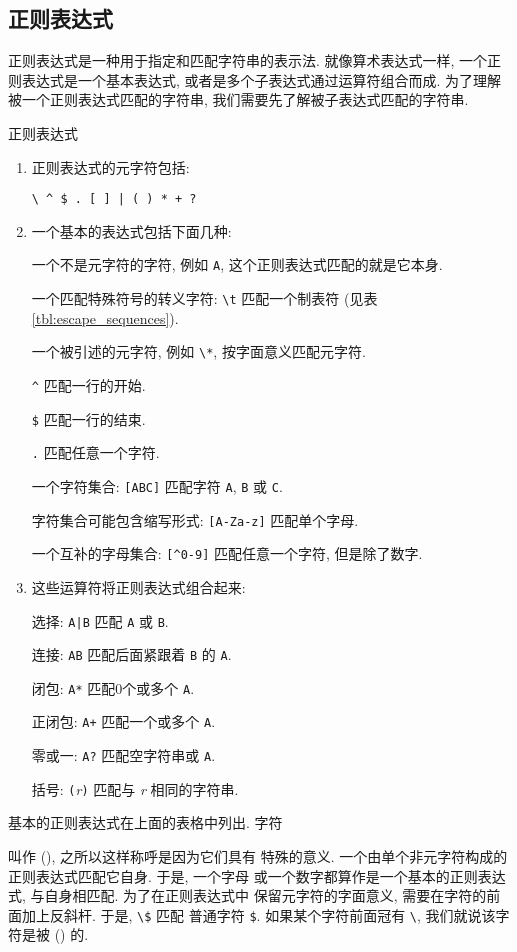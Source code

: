 \subsection{正则表达式}
\label{subsec:regular_expressions}
正则表达式是一种用于指定和匹配字符串的表示法. 就像算术表达式一样,
一个正则表达式是一个基本表达式, 或者是多个子表达式通过运算符组合而成.
为了理解被一个正则表达式匹配的字符串, 我们需要先了解被子表达式匹配的字符串.
\begin{summary}{正则表达式}
\begin{enumerate}
\item 正则表达式的元字符包括: \par
    \verb'\ ^ $ . [ ] | ( ) * + ?'
\item 一个基本的表达式包括下面几种: \par
    一个不是元字符的字符, 例如 \verb'A', 这个正则表达式匹配的就是它本身. \par
    一个匹配特殊符号的转义字符: \verb'\t' 匹配一个制表符 (见表
    \ref{tbl:escape_sequences}). \par
    一个被引述的元字符, 例如 \verb'\*', 按字面意义匹配元字符. \par
    \verb'^' 匹配一行的开始. \par
    \verb'$' 匹配一行的结束. \par
    \verb'.' 匹配任意一个字符. \par
    一个字符集合: \verb'[ABC]' 匹配字符 \verb'A', \verb'B' 或 \verb'C'. \par
    字符集合可能包含缩写形式: \verb'[A-Za-z]' 匹配单个字母. \par
    一个互补的字母集合: \verb'[^0-9]' 匹配任意一个字符, 但是除了数字.
\item 这些运算符将正则表达式组合起来:   \par
    选择: \verb'A|B' 匹配 \verb'A' 或 \verb'B'. \par
    连接: \verb'AB' 匹配后面紧跟着 \verb'B' 的 \verb'A'. \par
    闭包: \verb'A*' 匹配0个或多个 \verb'A'. \par
    正闭包: \verb'A+' 匹配一个或多个 \verb'A'. \par
    零或一: \verb'A?' 匹配空字符串或 \verb'A'. \par
    括号: \verb'('\textit{r}\verb')' 匹配与 \textit{r} 相同的字符串.
\end{enumerate}
\end{summary}

基本的正则表达式在上面的表格中列出. 字符
叫作  (), 之所以这样称呼是因为它们具有
特殊的意义. 一个由单个非元字符构成的正则表达式匹配它自身. 于是, 一个字母
或一个数字都算作是一个基本的正则表达式, 与自身相匹配.  为了在正则表达式中
保留元字符的字面意义, 需要在字符的前面加上反斜杆. 于是, \verb'\$' 匹配
普通字符 \verb'$'. 如果某个字符前面冠有 \verb'\', 我们就说该字符是被
 () 的.

